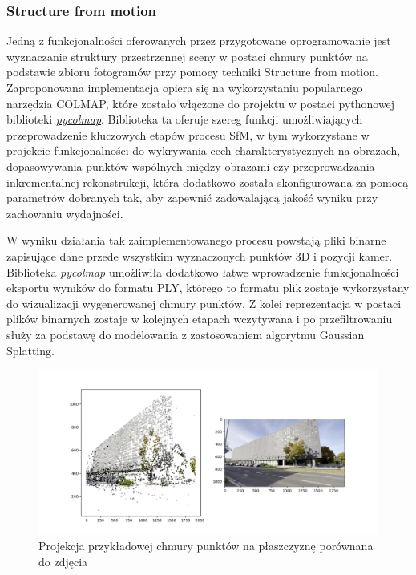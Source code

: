 \subsubsection{Structure from motion}
Jedną z funkcjonalności oferowanych przez przygotowane oprogramowanie jest wyznaczanie struktury przestrzennej sceny w postaci chmury punktów na podstawie zbioru fotogramów przy pomocy techniki Structure from motion. Zaproponowana implementacja opiera się na wykorzystaniu popularnego narzędzia COLMAP\cite{schoenberger2016mvs}\cite{Schonberger_2016_CVPR}, które zostało włączone do projektu w postaci pythonowej biblioteki \href{https://github.com/colmap/pycolmap}{\textit{pycolmap}}. Biblioteka ta oferuje szereg funkcji umożliwiających przeprowadzenie kluczowych etapów procesu SfM, w tym wykorzystane w projekcie funkcjonalności do wykrywania cech charakterystycznych na obrazach, dopasowywania punktów wspólnych między obrazami czy przeprowadzania inkrementalnej rekonstrukcji, która dodatkowo została skonfigurowana za pomocą parametrów dobranych tak, aby zapewnić zadowalającą jakość wyniku przy zachowaniu wydajności.

W wyniku działania tak zaimplementowanego procesu powstają pliki binarne zapisujące dane przede wszystkim wyznaczonych punktów 3D i pozycji kamer. Biblioteka \textit{pycolmap} umożliwiła dodatkowo łatwe wprowadzenie funkcjonalności eksportu wyników do formatu PLY, którego to formatu plik zostaje wykorzystany do wizualizacji wygenerowanej chmury punktów. Z kolei reprezentacja w postaci plików binarnych zostaje w kolejnych etapach wczytywana i po przefiltrowaniu służy za podstawę do modelowania z zastosowaniem algorytmu Gaussian Splatting.

\begin{figure}[!ht]
  \centering
  \includegraphics[width=0.9\linewidth]{img/sfm_projection.png}
  \caption{Projekcja przykładowej chmury punktów na płaszczyznę porównana do zdjęcia}
\end{figure}